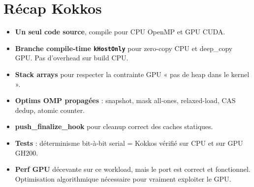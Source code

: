 \section{Récap Kokkos}
\label{sec:kokkos:recap}

\begin{itemize}
    \item \textbf{Un seul code source}, compile pour CPU OpenMP et GPU CUDA.
    \item \textbf{Branche compile-time \texttt{kHostOnly}} pour zero-copy CPU et deep\_copy GPU. Pas d'overhead sur build CPU.
    \item \textbf{Stack arrays} pour respecter la contrainte GPU « pas de heap dans le kernel ».
    \item \textbf{Optims OMP propagées} : snapshot, mask all-ones, relaxed-load, CAS dedup, atomic counter.
    \item \textbf{push\_finalize\_hook} pour cleanup correct des caches statiques.
    \item \textbf{Tests} : déterminisme bit-à-bit serial = Kokkos vérifié sur CPU et sur GPU GH200.
    \item \textbf{Perf GPU} décevante sur ce workload, mais le port est correct et fonctionnel. Optimisation algorithmique nécessaire pour vraiment exploiter le GPU.
\end{itemize}
